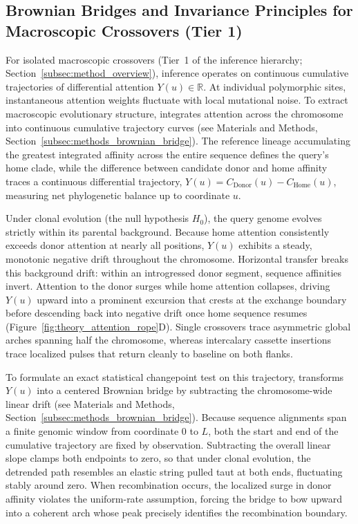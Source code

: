 \subsection{Brownian Bridges and Invariance Principles for Macroscopic Crossovers (Tier 1)}
\label{subsec:trajectory_bridge}
\label{subsec:changepoint}

For isolated macroscopic crossovers (Tier~1 of the inference hierarchy; Section~\ref{subsec:method_overview}), inference operates on continuous cumulative trajectories of differential attention $Y(u) \in \mathbb{R}$.
At individual polymorphic sites, instantaneous attention weights fluctuate with local mutational noise.
To extract macroscopic evolutionary structure, \RhizAeon integrates attention across the chromosome into continuous cumulative trajectory curves (see Materials and Methods, Section~\ref{subsec:methods_brownian_bridge}).
The reference lineage accumulating the greatest integrated affinity across the entire sequence defines the query's home clade, while the difference between candidate donor and home affinity traces a continuous differential trajectory, $Y(u) = C_{\mathrm{Donor}}(u) - C_{\mathrm{Home}}(u)$, measuring net phylogenetic balance up to coordinate $u$.

Under clonal evolution (the null hypothesis $H_0$), the query genome evolves strictly within its parental background.
Because home attention consistently exceeds donor attention at nearly all positions, $Y(u)$ exhibits a steady, monotonic negative drift throughout the chromosome.
Horizontal transfer breaks this background drift: within an introgressed donor segment, sequence affinities invert.
Attention to the donor surges while home attention collapses, driving $Y(u)$ upward into a prominent excursion that crests at the exchange boundary before descending back into negative drift once home sequence resumes (Figure~\ref{fig:theory_attention_rope}D).
Single crossovers trace asymmetric global arches spanning half the chromosome, whereas intercalary cassette insertions trace localized pulses that return cleanly to baseline on both flanks.

To formulate an exact statistical changepoint test on this trajectory, \RhizAeon transforms $Y(u)$ into a centered Brownian bridge by subtracting the chromosome-wide linear drift (see Materials and Methods, Section~\ref{subsec:methods_brownian_bridge}).
Because sequence alignments span a finite genomic window from coordinate $0$ to $L$, both the start and end of the cumulative trajectory are fixed by observation.
Subtracting the overall linear slope clamps both endpoints to zero, so that under clonal evolution, the detrended path resembles an elastic string pulled taut at both ends, fluctuating stably around zero.
When recombination occurs, the localized surge in donor affinity violates the uniform-rate assumption, forcing the bridge to bow upward into a coherent arch whose peak precisely identifies the recombination boundary.

